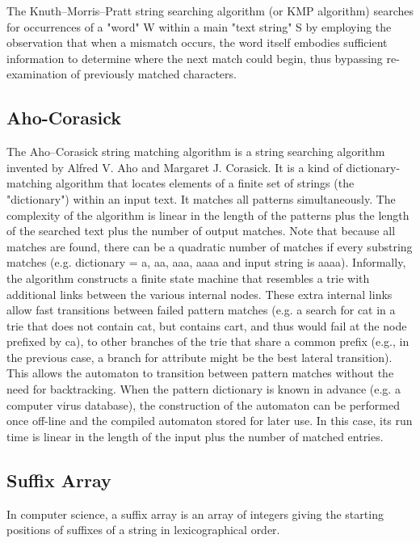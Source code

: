 \documentclass[10pt,letterpaper,twocolumn,twosided]{article}
\newcommand{\codigofuente}[1]{

\dotfill
}
\begin{document}
The Knuth–Morris–Pratt string searching algorithm (or KMP algorithm) searches for occurrences of a "word" W within a main "text string" S by employing the observation that when a mismatch occurs, the word itself embodies sufficient information to determine where the next match could begin, thus bypassing re-examination of previously matched characters.

\codigofuente{src/string/kmp.cpp}

\subsection{Aho-Corasick}

The Aho–Corasick string matching algorithm is a string searching algorithm invented by Alfred V. Aho and Margaret J. Corasick. It is a kind of dictionary-matching algorithm that locates elements of a finite set of strings (the "dictionary") within an input text. It matches all patterns simultaneously. The complexity of the algorithm is linear in the length of the patterns plus the length of the searched text plus the number of output matches. Note that because all matches are found, there can be a quadratic number of matches if every substring matches (e.g. dictionary = a, aa, aaa, aaaa and input string is aaaa).
Informally, the algorithm constructs a finite state machine that resembles a trie with additional links between the various internal nodes. These extra internal links allow fast transitions between failed pattern matches (e.g. a search for cat in a trie that does not contain cat, but contains cart, and thus would fail at the node prefixed by ca), to other branches of the trie that share a common prefix (e.g., in the previous case, a branch for attribute might be the best lateral transition). This allows the automaton to transition between pattern matches without the need for backtracking.
When the pattern dictionary is known in advance (e.g. a computer virus database), the construction of the automaton can be performed once off-line and the compiled automaton stored for later use. In this case, its run time is linear in the length of the input plus the number of matched entries.

\codigofuente{src/string/aho.cpp}

\subsection{Suffix Array}

In computer science, a suffix array is an array of integers giving the starting positions of suffixes of a string in lexicographical order.
\end{document}
